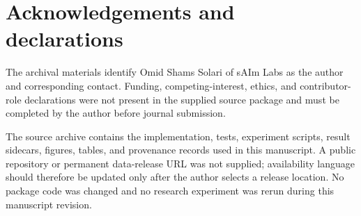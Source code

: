 \section*{Acknowledgements and declarations}
The archival materials identify Omid Shams Solari of sAIm Labs as the author and corresponding contact. Funding, competing-interest, ethics, and contributor-role declarations were not present in the supplied source package and must be completed by the author before journal submission.

The source archive contains the implementation, tests, experiment scripts, result sidecars, figures, tables, and provenance records used in this manuscript. A public repository or permanent data-release URL was not supplied; availability language should therefore be updated only after the author selects a release location. No package code was changed and no research experiment was rerun during this manuscript revision.
